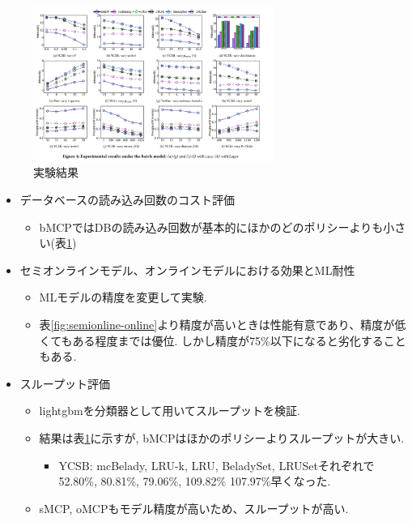 \documentclass[dvipdfmx,uplatex]{jsarticle}
\theoremstyle{remark}
\newenvironment{experiment}[1]{
    \begin{tcolorbox}[
        colframe=violet,
        colback=violet!10!white,
        colbacktitle=violet!40!white,
        coltitle=black,
        fonttitle=\bfseries,
        title={#1}
    ]
}{
    \end{tcolorbox}
}
\begin{document}
\begin{figure}
    \centering
    \includegraphics[width=0.7\textwidth]{img/cache-consistent/experiment-result.png}
    \caption{実験結果}
    \label{fig:experiment-result}
\end{figure}

\begin{experiment}{実験結果}
\begin{itemize}
    \item データベースの読み込み回数のコスト評価
    \begin{itemize}
        \item bMCPではDBの読み込み回数が基本的にほかのどのポリシーよりも小さい(表\ref{fig:experiment-result})
    \end{itemize}
    \item セミオンラインモデル、オンラインモデルにおける効果とML耐性
    \begin{itemize}
        \item MLモデルの精度を変更して実験.
        \item 表\ref{fig:semionline-online}より精度が高いときは性能有意であり、精度が低くてもある程度までは優位. しかし精度が75\%以下になると劣化することもある.
    \end{itemize}
    \item スループット評価
    \begin{itemize}
        \item lightgbmを分類器として用いてスループットを検証.
        \item 結果は表\ref{fig:experiment-result}に示すが, bMCPはほかのポリシーよりスループットが大きい.
        \begin{itemize}
            \item YCSB: mcBelady, LRU-k, LRU, BeladySet, 
LRUSetそれぞれで52.80\%, 80.81\%, 79.06\%, 109.82\%
107.97\%早くなった.
        \end{itemize}
        \item sMCP, oMCPもモデル精度が高いため、スループットが高い.
    \end{itemize}
\end{itemize}
\end{experiment}
\end{document}
